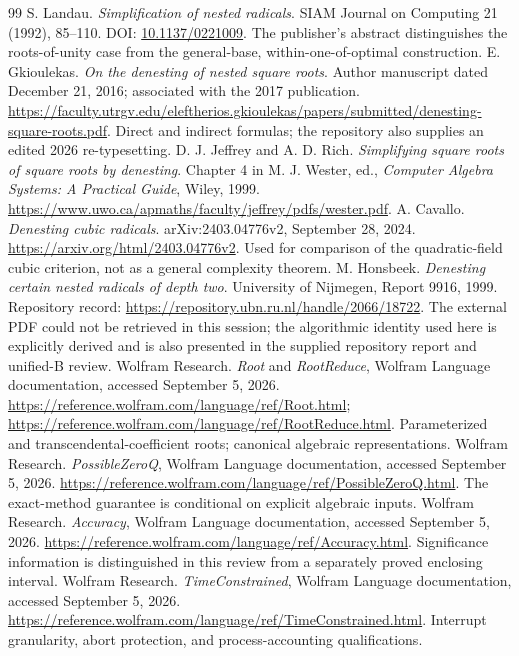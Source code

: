 \documentclass[11pt,a4paper]{article}
\theoremstyle{remark}\newtheorem{remark}[theorem]{Remark}
\begin{document}
\begin{thebibliography}{99}
 S. Landau. \emph{Simplification of nested radicals}. SIAM Journal on Computing 21 (1992), 85--110. DOI: \href{https://doi.org/10.1137/0221009}{10.1137/0221009}. The publisher's abstract distinguishes the roots-of-unity case from the general-base, within-one-of-optimal construction.
 E. Gkioulekas. \emph{On the denesting of nested square roots}. Author manuscript dated December 21, 2016; associated with the 2017 publication. \url{https://faculty.utrgv.edu/eleftherios.gkioulekas/papers/submitted/denesting-square-roots.pdf}. Direct and indirect formulas; the repository also supplies an edited 2026 re-typesetting.
 D. J. Jeffrey and A. D. Rich. \emph{Simplifying square roots of square roots by denesting}. Chapter 4 in M. J. Wester, ed., \emph{Computer Algebra Systems: A Practical Guide}, Wiley, 1999. \url{https://www.uwo.ca/apmaths/faculty/jeffrey/pdfs/wester.pdf}.
 A. Cavallo. \emph{Denesting cubic radicals}. arXiv:2403.04776v2, September 28, 2024. \url{https://arxiv.org/html/2403.04776v2}. Used for comparison of the quadratic-field cubic criterion, not as a general complexity theorem.
 M. Honsbeek. \emph{Denesting certain nested radicals of depth two}. University of Nijmegen, Report 9916, 1999. Repository record: \url{https://repository.ubn.ru.nl/handle/2066/18722}. The external PDF could not be retrieved in this session; the algorithmic identity used here is explicitly derived and is also presented in the supplied repository report and unified-B review.
 Wolfram Research. \emph{Root} and \emph{RootReduce}, Wolfram Language documentation, accessed September 5, 2026. \url{https://reference.wolfram.com/language/ref/Root.html}; \url{https://reference.wolfram.com/language/ref/RootReduce.html}. Parameterized and transcendental-coefficient roots; canonical algebraic representations.
 Wolfram Research. \emph{PossibleZeroQ}, Wolfram Language documentation, accessed September 5, 2026. \url{https://reference.wolfram.com/language/ref/PossibleZeroQ.html}. The exact-method guarantee is conditional on explicit algebraic inputs.
 Wolfram Research. \emph{Accuracy}, Wolfram Language documentation, accessed September 5, 2026. \url{https://reference.wolfram.com/language/ref/Accuracy.html}. Significance information is distinguished in this review from a separately proved enclosing interval.
 Wolfram Research. \emph{TimeConstrained}, Wolfram Language documentation, accessed September 5, 2026. \url{https://reference.wolfram.com/language/ref/TimeConstrained.html}. Interrupt granularity, abort protection, and process-accounting qualifications.
\end{thebibliography}
\end{document}
